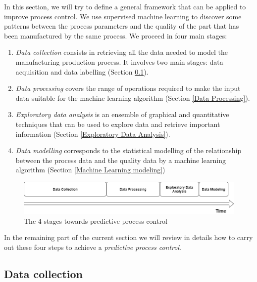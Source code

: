 In this section, we will try to define a general framework that can be applied to improve process control. We use supervised machine learning to discover some patterns between the process parameters and the quality of the part that has been manufactured by the same process. We proceed in four main stages:
\begin{enumerate}
    \item \textit{Data collection} consists in retrieving all the data needed to model the manufacturing production process. It involves two main stages:  data acquisition and  data labelling (Section \ref{Data Collection}). 
    \item \textit{Data processing} covers the range of operations required to make the input data suitable for the machine learning algorithm (Section \ref{Data Processing}). 
    \item \textit{Exploratory data analysis} is an ensemble of graphical and quantitative techniques that can be used to explore data and retrieve important information (Section \ref{Exploratory Data Analysis}).
    \item \textit{Data modelling} corresponds to the statistical modelling of the relationship between the process data and the quality data by a machine learning algorithm (Section \ref{Machine Learning modeling})
\end{enumerate}
%
\begin{figure}
\centerline{\includegraphics[scale=0.45]{images/chapter_3/stages.png}}
\caption{The 4 stages towards predictive process control}
\label{fig:4_stages}
\end{figure}
%
In the remaining part of the current section we will review in details how to carry out these four steps to achieve a \textit{predictive process control}. 

\subsection{Data collection} \label{Data Collection}

